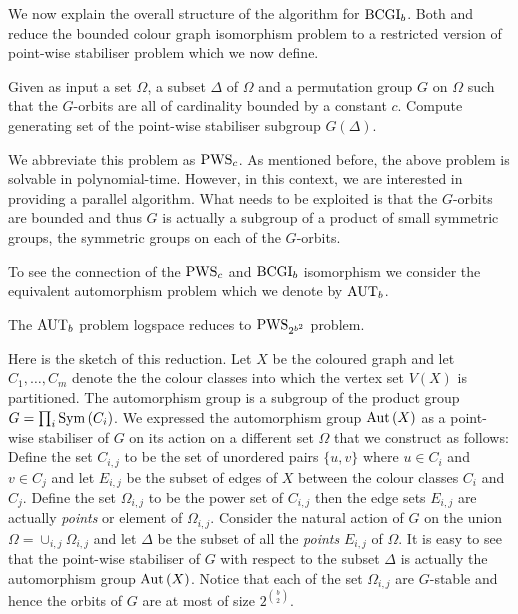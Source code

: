 \documentclass{article}
\begin{document}
We now explain the overall structure of the algorithm for
$\BCGI{b}$. Both \citet{luks86parallel} and \citet{arvind2005bounded}
reduce the bounded colour graph isomorphism problem to a restricted
version of point-wise stabiliser problem which we now define.

\begin{problem}
  Given as input a set $\Omega$, a subset $\Delta$ of $\Omega$ and a
  permutation group $G$ on $\Omega$ such that the $G$-orbits are all
  of cardinality bounded by a constant $c$.  Compute generating set of
  the point-wise stabiliser subgroup $G(\Delta)$.
\end{problem}

We abbreviate this problem as $\PWS{c}$. As mentioned before, the
above problem is solvable in polynomial-time.  However, in this
context, we are interested in providing a parallel algorithm. What
needs to be exploited is that the $G$-orbits are bounded and thus $G$
is actually a subgroup of a product of small symmetric groups, the
symmetric groups on each of the $G$-orbits.

To see the connection of the $\PWS{c}$ and $\BCGI{b}$ isomorphism we
consider the equivalent automorphism problem which we denote by
$\AUT[b]$.

\begin{lemma}
  The $\AUT[b]$ problem logspace reduces to $\PWS{2^{b^2}}$ problem.
\end{lemma}

Here is the sketch of this reduction. Let $X$ be the coloured graph
and let $C_1,\ldots, C_m$ denote the the colour classes into which the
vertex set $V(X)$ is partitioned. The automorphism group is a subgroup
of the product group $G = \prod_{i}\Sym{C_i}$. We expressed the
automorphism group $\Aut{X}$ as a point-wise stabiliser of $G$ on its
action on a different set $\Omega$ that we construct as follows:
Define the set $C_{i,j}$ to be the set of unordered pairs $\{u,v\}$
where $u\in C_i$ and $v \in C_j$ and let $E_{i,j}$ be the subset of
edges of $X$ between the colour classes $C_i$ and $C_j$. Define the
set $\Omega_{i,j}$ to be the power set of $C_{i,j}$ then the edge sets
$E_{i,j}$ are actually \emph{points} or element of
$\Omega_{i,j}$. Consider the natural action of $G$ on the union
$\Omega = \cup_{i,j} \Omega_{i,j}$ and let $\Delta$ be the subset of
all the \emph{points} $E_{i,j}$ of $\Omega$. It is easy to see that
the point-wise stabiliser of $G$ with respect to the subset $\Delta$ is
actually the automorphism group $\Aut{X}$. Notice that each of the set
$\Omega_{i,j}$ are $G$-stable and hence the orbits of $G$ are at most
of size $2^{b \choose 2}$.
\end{document}
